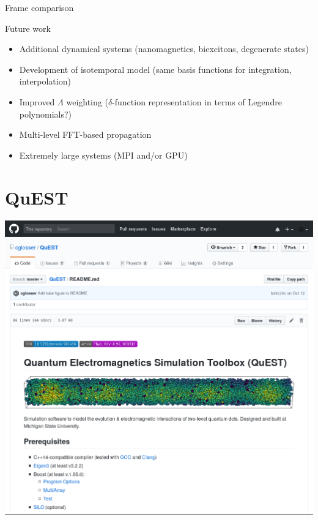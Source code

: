 \documentclass[aspectratio=169]{beamer}
\begin{document}
\begin{frame}{Frame comparison}
  \vspace{0.5cm}
  \begin{center}
    
  \end{center}
\end{frame}

\begin{frame}{Future work}
  \begin{itemize}
    \item Additional dynamical systems (nanomagnetics, biexcitons, degenerate states)
    \item Development of isotemporal model (same basis functions for integration, interpolation)
    \item Improved $\Lambda$ weighting ($\delta$-function representation in terms of Legendre polynomials?)
    \item Multi-level FFT-based propagation
    \item Extremely large systems (MPI and/or GPU)
  \end{itemize}
\end{frame}

\section{QuEST}

\begin{frame}
  \centering
  \vspace{0.5cm}
  \href{https://www.github.com/cglosser/quest}{
    \includegraphics[height=\textheight]{figures/github.png}
  }
\end{frame}
\end{document}
